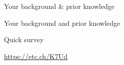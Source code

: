 \begin{frame}{Your background \& prior knowledge}
    \begin{center}
        \LARGE{Your background and prior knowledge}
    \end{center}
\end{frame}
\begin{frame}{Quick survey}
    \begin{center}
        \LARGE{\url{https://etc.ch/K7Ud}}
        \vspace{1em}
        \begin{center}
        \end{center}
    \end{center}
\end{frame}

